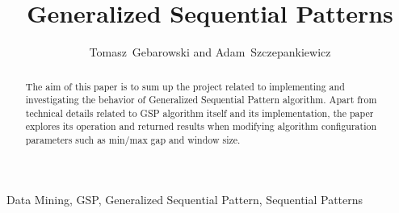 \documentclass[journal,a4paper]{IEEEtran}
\begin{document}
\title{Generalized Sequential Patterns}


\author{Tomasz~Gebarowski and Adam~Szczepankiewicz}

%
\markboth{}{}
%
%











%
\pagestyle{empty}%
\maketitle%
\thispagestyle{empty}%
%


\begin{abstract}
The aim of this paper is to sum up the project related to implementing and investigating the behavior of Generalized Sequential Pattern algorithm.
Apart from technical details related to GSP algorithm itself and its implementation, the paper explores its operation and returned results when modifying algorithm configuration parameters such as min/max gap and window size.
\end{abstract}

\begin{IEEEkeywords}
Data Mining, GSP, Generalized Sequential Pattern, Sequential Patterns
\end{IEEEkeywords}

\end{document}
